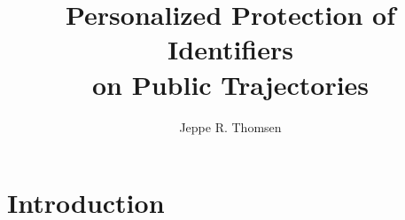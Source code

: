 \documentclass[t,mathserif]{beamer}
\title[DAT8\hspace{21em}\insertframenumber/\inserttotalframenumber]{Personalized Protection of Identifiers\\on Public Trajectories}
\author[Jeppe]{Jeppe R. Thomsen }%
\institute{Aalborg University\\ Department of Computer Science}
\begin{document}
\begin{frame} %
\titlepage
\end{frame}

%
%
%
\section{Introduction} %


%
%

%
%


%
%
%

\end{document}

